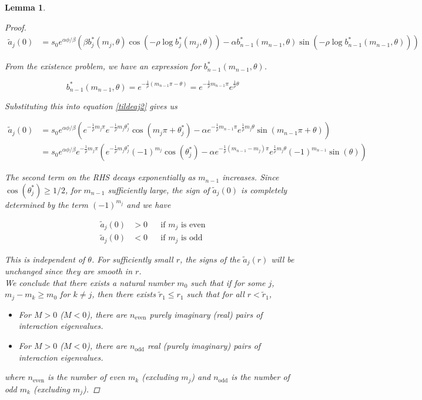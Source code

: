 \documentclass[12pt]{article}
\newtheorem{lemma}{Lemma}
\begin{document}
\begin{lemma}
\begin{proof}
\begin{align}\label{tildeaj2}
\tilde{a}_j(0) 
&= s_0 e^{\alpha \phi/\beta} \left( \beta b^*_j(m_j, \theta) \cos\left( -\rho \log b^*_j(m_j, \theta) \right) - \alpha b^*_{n-1}(m_{n-1}, \theta) \sin \left(  -\rho \log b^*_{n-1}(m_{n-1}, \theta) \right) \right) 
\end{align}

From the existence problem, we have an expression for $b^*_{n-1}(m_{n-1}, \theta)$.

\[
b^*_{n-1}(m_{n-1}, \theta) = e^{ -\frac{1}{\rho}(m_{n-1} \pi - \theta) } =
e^{ -\frac{1}{\rho}m_{n-1} \pi} e^{ \frac{1}{\rho}\theta }
\]

Substituting this into equation \eqref{tildeaj2} gives us

\begin{align*}
\tilde{a}_j(0) 
&= s_0 e^{\alpha \phi/\beta} \left( e^{ -\frac{1}{\rho} m_j \pi } e^{ -\frac{1}{\rho} m_j \theta^*_j } \cos\left( m_j \pi + \theta^*_j \right) - \alpha e^{ -\frac{1}{\rho} m_{n-1} \pi } e^{\frac{1}{\rho} m_j \theta } \sin \left( m_{n-1} \pi + \theta \right) \right) \\
&= s_0 e^{\alpha \phi/\beta} e^{ -\frac{1}{\rho} m_j \pi } \left(  e^{ -\frac{1}{\rho} m_j \theta^*_j } (-1)^{m_j} \cos(\theta^*_j) - \alpha e^{ -\frac{1}{\rho} (m_{n-1} - m_j) \pi } e^{\frac{1}{\rho} m_j \theta } (-1)^{m_{n-1}}\sin(\theta ) \right)  
\end{align*}

The second term on the RHS decays exponentially as $m_{n-1}$ increases. Since $\cos(\theta^*_j) \geq 1/2$, for $m_{n-1}$ sufficiently large, the sign of $\tilde{a}_j(0)$ is completely determined by the term $(-1)^{m_j}$ and we have

\begin{align*}
\tilde{a}_j(0) &> 0 && \text{if } m_j \text{ is even} \\
\tilde{a}_j(0) &< 0 && \text{if } m_j \text{ is odd}
\end{align*}

This is independent of $\theta$. For sufficiently small $r$, the signs of the $\tilde{a}_j(r)$ will be unchanged since they are smooth in $r$.\\

We conclude that there exists a natural number $m_0$ such that if for some $j$, $m_j - m_k \geq m_0$ for $k \neq j$, then there exists $\tilde{r}_1 \leq r_1$ such that for all $r < \tilde{r}_1$, 

\begin{itemize}
\item For $M > 0$ ($M < 0$), there are $n_{\text{even}}$ purely imaginary (real) pairs of interaction eigenvalues.
\item For $M > 0$ ($M < 0$), there are $n_{\text{odd}}$ real (purely imaginary) pairs of interaction eigenvalues.
\end{itemize}

where $n_{\text{even}}$ is the number of even $m_k$ (excluding $m_j$) and $n_{\text{odd}}$ is the number of odd $m_k$ (excluding $m_j$).

\end{proof}
\end{lemma}
\end{document}
